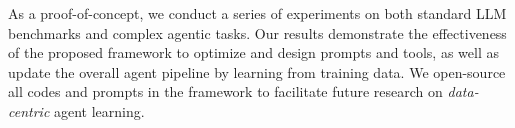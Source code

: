 As a proof-of-concept, we conduct a series of experiments on both standard LLM benchmarks and complex agentic tasks. Our results demonstrate the effectiveness of the proposed \baby framework to optimize and design prompts and tools, as well as update the overall agent pipeline by learning from training data. We open-source all codes and prompts in the \baby framework to facilitate future research on \textit{data-centric} agent learning. 


